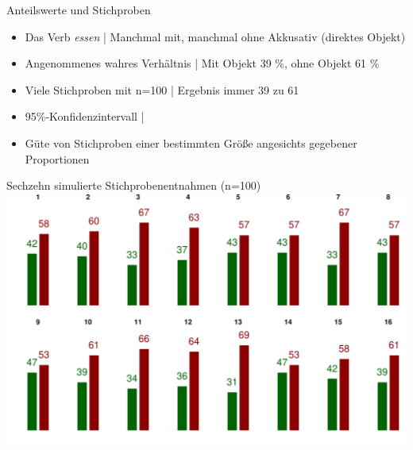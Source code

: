\begin{frame}
  {Anteilswerte und Stichproben}
  \begin{itemize}[<+->]
    \item Das Verb \textit{essen} | Manchmal mit, manchmal ohne Akkusativ (direktes Objekt)
    \item Angenommenes wahres Verhältnis | \alert{Mit Objekt 39 \%, ohne Objekt 61 \%}
      \Halbzeile
    \item Viele Stichproben mit n=100 | Ergebnis  immer 39 zu 61
     \Doppelzeile 
    \item \alert{95\%-Konfidenzintervall} | 
    \item Güte von Stichproben einer bestimmten Größe angesichts gegebener Proportionen
  \end{itemize}
\end{frame}


\begin{frame}
  {Sechzehn simulierte Stichprobenentnahmen (n=100)}
  \centering 
  \includegraphics[height=0.8\textheight]{RVorlesung/sixteenbernoullis}
\end{frame}

